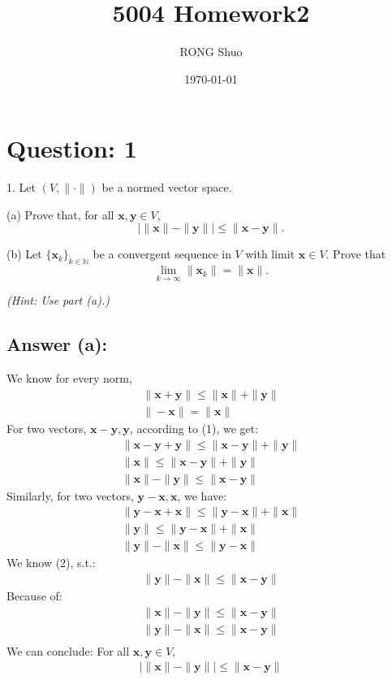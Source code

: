 \documentclass[a4paper,12pt]{article}
\newcommand{\N}{\mathbb{N}}
\begin{document}
\title{5004 Homework2}
\author{RONG Shuo}
\date{\today}
\maketitle

\section*{Question: 1}
1. Let \((V, \|\cdot\|)\) be a normed vector space.

(a) Prove that, for all \(\bm{x}, \bm{y} \in V\),
\[
    |\|\bm{x}\| - \|\bm{y}\|| \leq \|\bm{x} - \bm{y}\|.
\]

(b) Let \(\{\bm{x}_k\}_{k\in \N}\) be a convergent sequence in \(V\) with limit \(\bm{x} \in V\). Prove that
\[
    \lim_{k\to\infty}\|\bm{x}_k\| = \|\bm{x}\|.
\]

\textit{(Hint: Use part (a).)}

\subsection*{Answer (a):}
We know for every norm, 
\begin{align}
    \|\bm{x} + \bm{y}\| \leq \|\bm{x}\| + \|\bm{y}\| \\
    \|-\bm{x}\| = \|\bm{x}\| 
\end{align}
For two vectors, \(\bm{x - y}, \bm{y}\), according to (1), we get:
\begin{align*}
    \|\bm{x} - \bm{y} + \bm{y}\| \leq \|\bm{x} - \bm{y}\| + \|\bm{y}\|  \\
    \|\bm{x}\| \leq \|\bm{x} - \bm{y}\| + \|\bm{y}\|  \\
    \|\bm{x}\| - \|\bm{y}\| \leq \|\bm{x} - \bm{y}\| 
\end{align*}
Similarly, for two vectors, \(\bm{y -x}, \bm{x}\), we have:
\begin{align*}
    \|\bm{y} - \bm{x} + \bm{x}\| \leq \|\bm{y} - \bm{x}\| + \|\bm{x}\|  \\
    \|\bm{y}\| \leq \|\bm{y} - \bm{x}\| + \|\bm{x}\|  \\
    \|\bm{y}\| - \|\bm{x}\| \leq \|\bm{y} - \bm{x}\| 
\end{align*}
We know (2), s.t.:
\begin{align*}
    \|\bm{y}\| - \|\bm{x}\| \leq \|\bm{x} - \bm{y}\| 
\end{align*}
Because of:
\begin{align*}
    \|\bm{x}\| - \|\bm{y}\| \leq \|\bm{x} - \bm{y}\|  \\
    \|\bm{y}\| - \|\bm{x}\| \leq \|\bm{x} - \bm{y}\|  \\
\end{align*}
We can conclude:
For all \(\bm{x}, \bm{y} \in V\),
\begin{align}
    |\|\bm{x}\| - \|\bm{y}\|| \leq \|\bm{x} - \bm{y}\|
\end{align}
\end{document}
